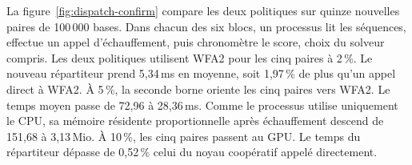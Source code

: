 La figure~\ref{fig:dispatch-confirm} compare les deux politiques sur quinze nouvelles paires de 100\,000 bases. Dans chacun des six blocs, un processus lit les séquences, effectue un appel d’échauffement, puis chronomètre le score, choix du solveur compris. Les deux politiques utilisent WFA2 pour les cinq paires à 2\,\%. Le nouveau répartiteur prend 5,34\,ms en moyenne, soit 1,97\,\% de plus qu’un appel direct à WFA2.
À 5\,\%, la seconde borne oriente les cinq paires vers WFA2. Le temps moyen passe de 72,96 à 28,36\,ms. Comme le processus utilise uniquement le CPU, sa mémoire résidente proportionnelle après échauffement descend de 151,68 à 3,13\,Mio. À 10\,\%, les cinq paires passent au GPU. Le temps du répartiteur dépasse de 0,52\,\% celui du noyau coopératif appelé directement.

